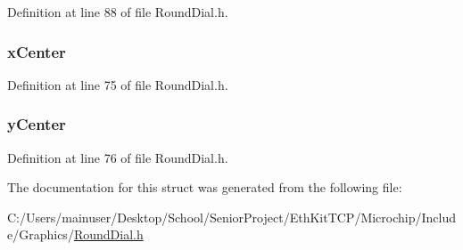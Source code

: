 Definition at line 88 of file Round\+Dial.\+h.

\hypertarget{struct_r_o_u_n_d_d_i_a_l_aea1d1e18200cb2a91fcd74c6e1172ba8}{}
\subsubsection[{x\+Center}]{ x\+Center}\label{struct_r_o_u_n_d_d_i_a_l_aea1d1e18200cb2a91fcd74c6e1172ba8}


Definition at line 75 of file Round\+Dial.\+h.

\hypertarget{struct_r_o_u_n_d_d_i_a_l_aeb7c9f7af073c797530bda5b0989e239}{}
\subsubsection[{y\+Center}]{ y\+Center}\label{struct_r_o_u_n_d_d_i_a_l_aeb7c9f7af073c797530bda5b0989e239}


Definition at line 76 of file Round\+Dial.\+h.



The documentation for this struct was generated from the following file\+:\begin{DoxyCompactItemize}
\item 
C\+:/\+Users/mainuser/\+Desktop/\+School/\+Senior\+Project/\+Eth\+Kit\+T\+C\+P/\+Microchip/\+Include/\+Graphics/\hyperlink{_round_dial_8h}{Round\+Dial.\+h}\end{DoxyCompactItemize}
